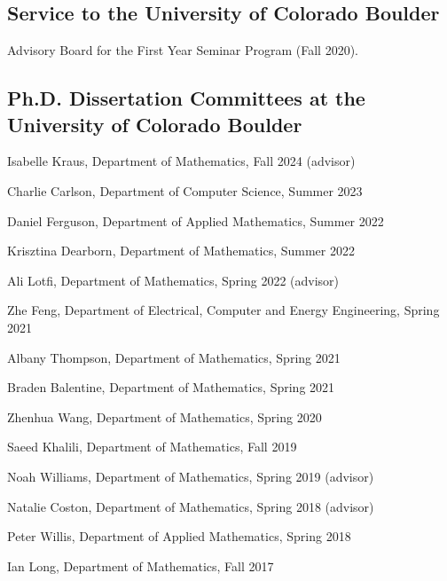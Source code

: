 \documentclass[letterpaper]{article}
\renewenvironment{itemize}{
  \begin{list}{}{
    \setlength{\leftmargin}{1em}
  }
}{
  \end{list}
}
\begin{document}
\subsection*{Service to the University of Colorado Boulder} 
\begin{itemize}
	\item Advisory Board for the First Year Seminar Program (Fall 2020). 
\end{itemize}

\subsection*{Ph.D. Dissertation Committees at the University of Colorado Boulder} 
\begin{itemize}
	\item Isabelle Kraus, Department of Mathematics, Fall 2024 (advisor)
	\item Charlie Carlson, Department of Computer Science, Summer 2023
	\item Daniel Ferguson, Department of Applied Mathematics, Summer 2022
	\item Krisztina Dearborn, Department of Mathematics, Summer 2022
	\item Ali Lotfi, Department of Mathematics, Spring 2022 (advisor)
	\item Zhe Feng, Department of Electrical, Computer and Energy Engineering, Spring 2021
	\item Albany Thompson, Department of Mathematics, Spring 2021
	\item Braden Balentine, Department of Mathematics, Spring 2021
	\item Zhenhua Wang, Department of Mathematics, Spring 2020 
	\item Saeed Khalili, Department of Mathematics, Fall 2019 
	\item Noah Williams, Department of Mathematics, Spring 2019 (advisor)
	\item Natalie Coston, Department of Mathematics, Spring 2018 (advisor) 
	\item Peter Willis, Department of Applied Mathematics, Spring 2018 
	\item Ian Long, Department of Mathematics, Fall 2017
\end{itemize}
\end{document}
